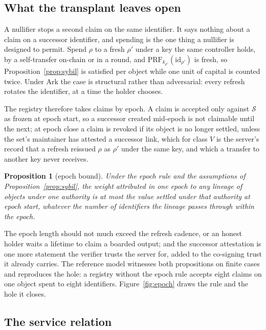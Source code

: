 \documentclass[11pt]{article}
\theoremstyle{plain}
\newtheorem{proposition}{Proposition}
\theoremstyle{definition}
\theoremstyle{remark}
\newcommand{\sett}{\mathcal{S}}
\begin{document}
\subsection{What the transplant leaves open}

A nullifier stops a second claim on the same identifier. It says nothing about a claim on a successor identifier, and spending is the one thing a nullifier is designed to permit. Spend $\rho$ to a fresh $\rho'$ under a key the same controller holds, by a self-transfer on-chain or in a round, and $\mathrm{PRF}_{k_{\rho'}}(\mathrm{id}_{\rho'})$ is fresh, so Proposition~\ref{prop:sybil} is satisfied per object while one unit of capital is counted twice. Under Ark the case is structural rather than adversarial: every refresh rotates the identifier, at a time the holder chooses.

The registry therefore takes claims by epoch. A claim is accepted only against $\sett$ as frozen at epoch start, so a successor created mid-epoch is not claimable until the next; at epoch close a claim is revoked if its object is no longer settled, unless the set's maintainer has attested a successor link, which for class $V$ is the server's record that a refresh reissued $\rho$ as $\rho'$ under the same key, and which a transfer to another key never receives.

\begin{proposition}[epoch bound]
\label{prop:epoch}
Under the epoch rule and the assumptions of Proposition~\ref{prop:sybil}, the weight attributed in one epoch to any lineage of objects under one authority is at most the value settled under that authority at epoch start, whatever the number of identifiers the lineage passes through within the epoch.
\end{proposition}

The epoch length should not much exceed the refresh cadence, or an honest holder waits a lifetime to claim a boarded output; and the successor attestation is one more statement the verifier trusts the server for, added to the co-signing trust it already carries. The reference model witnesses both propositions on finite cases and reproduces the hole: a registry without the epoch rule accepts eight claims on one object spent to eight identifiers. Figure~\ref{fig:epoch} draws the rule and the hole it closes.



\subsection{The service relation}
\end{document}
